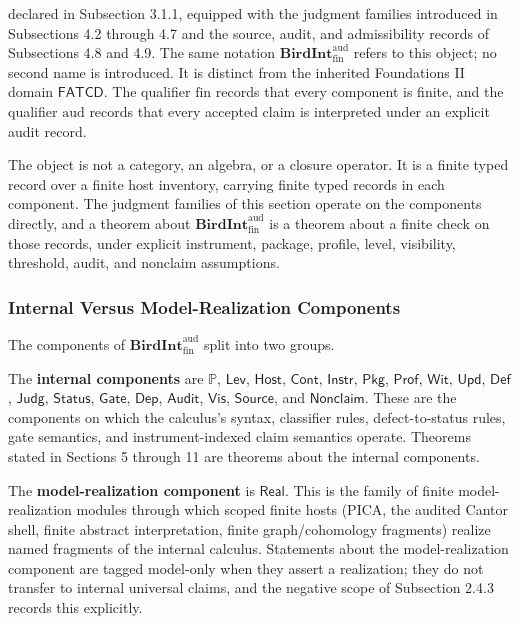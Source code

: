 \documentclass[11pt]{article}
\theoremstyle{definition}
\begin{document}
declared in Subsection 3.1.1, equipped with the judgment families introduced in Subsections 4.2 through 4.7 and the source, audit, and admissibility records of Subsections 4.8 and 4.9. The same notation \(\mathbf{BirdInt}^{\mathrm{aud}}_{\mathrm{fin}}\) refers to this object; no second name is introduced. It is distinct from the inherited Foundations II domain \(\mathsf{FATCD}\). The qualifier \(\mathrm{fin}\) records that every component is finite, and the qualifier \(\mathrm{aud}\) records that every accepted claim is interpreted under an explicit audit record.

The object is not a category, an algebra, or a closure operator. It is a finite typed record over a finite host inventory, carrying finite typed records in each component. The judgment families of this section operate on the components directly, and a theorem about \(\mathbf{BirdInt}^{\mathrm{aud}}_{\mathrm{fin}}\) is a theorem about a finite check on those records, under explicit instrument, package, profile, level, visibility, threshold, audit, and nonclaim assumptions.

\subsubsection{Internal Versus Model-Realization Components}

The components of \(\mathbf{BirdInt}^{\mathrm{aud}}_{\mathrm{fin}}\) split into two groups.

The \textbf{internal components} are \(\mathbb P\), \(\mathsf{Lev}\), \(\mathsf{Host}\), \(\mathsf{Cont}\), \(\mathsf{Instr}\), \(\mathsf{Pkg}\), \(\mathsf{Prof}\), \(\mathsf{Wit}\), \(\mathsf{Upd}\), \(\mathsf{Def}\), \(\mathsf{Judg}\), \(\mathsf{Status}\), \(\mathsf{Gate}\), \(\mathsf{Dep}\), \(\mathsf{Audit}\), \(\mathsf{Vis}\), \(\mathsf{Source}\), and \(\mathsf{Nonclaim}\). These are the components on which the calculus's syntax, classifier rules, defect-to-status rules, gate semantics, and instrument-indexed claim semantics operate. Theorems stated in Sections 5 through 11 are theorems about the internal components.

The \textbf{model-realization component} is \(\mathsf{Real}\). This is the family of finite model-realization modules through which scoped finite hosts (PICA, the audited Cantor shell, finite abstract interpretation, finite graph/cohomology fragments) realize named fragments of the internal calculus. Statements about the model-realization component are tagged model-only when they assert a realization; they do not transfer to internal universal claims, and the negative scope of Subsection 2.4.3 records this explicitly.
\end{document}
